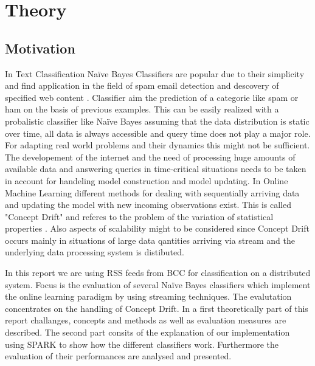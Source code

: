 \documentclass[12pt]{article}
\begin{document}


\renewcommand{\contentsname}{Table of Contents}
\tableofcontents

\newpage



\section{Theory}
\subsection{Motivation}
\begin{spacing}{1.2}
In Text Classification Na\"ive Bayes Classifiers are popular due to their simplicity and find application in the field of spam email detection and descovery of specified web content \citep[p. 225]{ertel2008}. Classifier aim the prediction of a categorie like spam or ham on the basis of previous examples. This can be easily realized with a probalistic classifier like Na\"ive Bayes assuming that the data distribution is static over time, all data is always accessible and query time does not play a major role. For adapting real world problems and their dynamics this might not be sufficient. The developement of the internet and the need of processing huge amounts of available data and answering queries in time-critical situations needs to be taken in account for handeling model construction and model updating. In Online Machine Learning different methods for dealing with sequentially arriving data and updating the model with new incoming observations exist. This is called "Concept Drift" and referes to the problem of the variation of statistical properties \citep{astudillo2013}. Also aspects of scalability might to be considered since Concept Drift occurs mainly in situations of large data qantities arriving via stream \citep[p. 4]{tsymbal2004} and the underlying data processing system is distibuted.   

In this report we are using RSS feeds from BCC for classification on a distributed system. Focus is the evaluation of several Na\"ive Bayes classifiers which implement the online learning paradigm by using streaming techniques.  The evalutation concentrates on the handling of Concept Drift. In a first theoretically part of this report challanges, concepts and methods as well as evaluation measures are described. The second part consits of the explanation of our implementation using SPARK to show how the different classifiers work. Furthermore the evaluation of their performances are analysed and presented.

\end{spacing}
\end{document}
